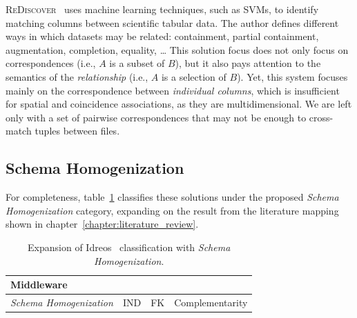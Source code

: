 \textsc{ReDiscover}~\cite{alawini2016} uses machine learning techniques, such as
\glspl{SVM}, to identify matching columns between scientific tabular data.
The author defines different ways in which datasets may be related:
containment, partial containment, augmentation, completion, equality, \ldots
This solution focus does not only focus on correspondences (i.e., $A$ is a subset of $B$),
but it also pays attention to the semantics of the \emph{relationship} (i.e., $A$
is a selection of $B$).
Yet, this system focuses mainly on the correspondence between \emph{individual columns},
which is insufficient for spatial and coincidence associations, as they are multidimensional.
We are left only with a set of pairwise correspondences that may not be enough to cross-match
tuples between files.

\subsection{Schema Homogenization}
\label{sec:schema_homogeneization}

For completeness, table~\ref{tab:missing_middleware} classifies these solutions
under the proposed \emph{Schema Homogenization} category,
expanding on the result from the literature mapping shown in chapter~\ref{chapter:literature_review}.

\begin{table}[ht]
    \centering
    \begin{tabularx}{\linewidth}{p{7em} >{\raggedright}X >{\raggedright}X X}
    \hline
    \multicolumn{4}{l}{\textbf{Middleware}} \\
    \hline
    \textit{Schema \mbox{Homogenization}} &
    \gls{IND}     \cite{DeMarchi2002,DeMarchi2003zigzag,koeller2002integration} &
    \gls{FK}      \cite{Rostin2009,Zhang2010,jiang_holistic_2020} &
    Complementarity \cite{alawini2016} \\
    \hline
    \end{tabularx}
    \caption[Articles under Schema Homogenization.]{
    Expansion of Idreos~\cite{Idreos2015} classification with \emph{Schema Homogenization}.}
    \label{tab:missing_middleware}
\end{table}


